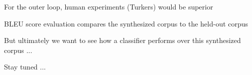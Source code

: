 \documentclass[12pt]{beamer}
\begin{document}
\begin{frame}{}
  For the outer loop, human experiments (Turkers) would be superior
\end{frame}

\begin{frame}{}
  BLEU score evaluation compares the synthesized corpus to the held-out corpus
\end{frame}

\begin{frame}{}
  But ultimately we want to see how a classifier performs over this synthesized
  corpus ...

  Stay tuned ...
\end{frame}
\end{document}
